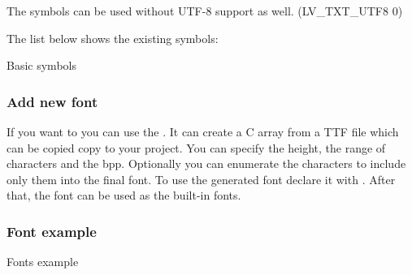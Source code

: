 \documentclass[letterpaper,10pt,english]{sphinxmanual}
\begin{document}
%
\begin{sphinxVerbatim}[commandchars=\\\{\}]
\end{sphinxVerbatim}

The symbols can be used without UTF-8 support as well. (LV\_TXT\_UTF8 0)

The list below shows the existing symbols:

Basic symbols


\subsubsection{Add new font}
\label{\detokenize{overview/fonts:add-new-font}}
If you want to  you can use the . It can create a C array from a TTF file which can be copied copy to your project. You can specify the height, the range of characters and the bpp. Optionally you can enumerate the characters to include only them into the final font. To use the generated font declare it with . After that, the font can be used as the built-in fonts.


\subsubsection{Font example}
\label{\detokenize{overview/fonts:font-example}}
Fonts example
\end{document}
